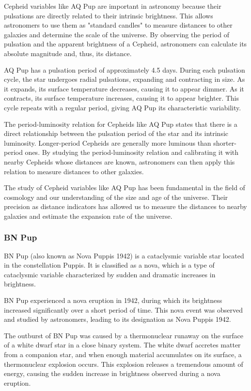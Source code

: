 Cepheid variables like AQ Pup are important in astronomy because their pulsations are directly related to their intrinsic brightness. This allows astronomers to use them as "standard candles" to measure distances to other galaxies and determine the scale of the universe. By observing the period of pulsation and the apparent brightness of a Cepheid, astronomers can calculate its absolute magnitude and, thus, its distance.

AQ Pup has a pulsation period of approximately 4.5 days. During each pulsation cycle, the star undergoes radial pulsations, expanding and contracting in size. As it expands, its surface temperature decreases, causing it to appear dimmer. As it contracts, its surface temperature increases, causing it to appear brighter. This cycle repeats with a regular period, giving AQ Pup its characteristic variability.

The period-luminosity relation for Cepheids like AQ Pup states that there is a direct relationship between the pulsation period of the star and its intrinsic luminosity. Longer-period Cepheids are generally more luminous than shorter-period ones. By studying the period-luminosity relation and calibrating it with nearby Cepheids whose distances are known, astronomers can then apply this relation to measure distances to other galaxies.

The study of Cepheid variables like AQ Pup has been fundamental in the field of cosmology and our understanding of the size and age of the universe. Their precision as distance indicators has allowed us to measure the distances to nearby galaxies and estimate the expansion rate of the universe.

\subsubsection*{ BN Pup }
BN Pup (also known as Nova Puppis 1942) is a cataclysmic variable star located in the constellation Puppis. It is classified as a nova, which is a type of cataclysmic variable characterized by sudden and dramatic increases in brightness.

BN Pup experienced a nova eruption in 1942, during which its brightness increased significantly over a short period of time. This nova event was observed and studied by astronomers, leading to its designation as Nova Puppis 1942.

The outburst of BN Pup was caused by a thermonuclear runaway on the surface of a white dwarf star in a close binary system. The white dwarf accretes matter from a companion star, and when enough material accumulates on its surface, a thermonuclear explosion occurs. This explosion releases a tremendous amount of energy, causing the sudden increase in brightness observed during a nova eruption.

